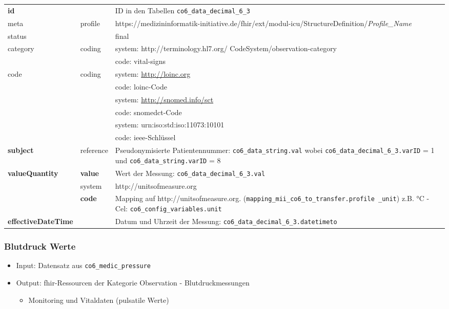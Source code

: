 \begin{longtable}{|l|l|p{7.5cm}|} 
	\hline
	\rowcolor{lightgray} \multicolumn{3}{|l|}{Data Mapping (inhaltlich) - nummerische Werte} \\ \hline
	\textbf{id} &  & ID in den Tabellen \texttt{co6\_data\_decimal\_6\_3} \\ \hline
	meta & profile & https://medizininformatik-initiative.de/fhir/ext/modul-icu/StructureDefinition/\textsl{Profile\_Name} \\ \hline 
	status &  & final  \\ \hline 
	category & coding & system: http://terminology.hl7.org/ CodeSystem/observation-category \\ 
	\cline{3-3}
	& & code: vital-signs \\ \hline
	code & coding & system: \url{http://loinc.org} \\ 
	\cline{3-3} 
	&  & code: \ac{loinc}-Code \\ 
	\cline{3-3} 
	&  & system: \url{http://snomed.info/sct} \\ 
	\cline{3-3}
	&  & code: \ac{snomedct}-Code \\ 
	\cline{3-3} 
	&  & system: urn:iso:std:iso:11073:10101 \\ 
	\cline{3-3}
	&  & code: \ac{ieee}-Schlüssel \\ \hline
	\textbf{subject} & reference & Pseudonymisierte Patientennummer: \texttt{co6\_data\_string.val} wobei \texttt{co6\_data\_decimal\_6\_3.varID} = 1 und \texttt{co6\_data\_string.varID} = 8 \\ \hline
	\textbf{valueQuantity} & \textbf{value} & Wert der Messung: \texttt{co6\_data\_decimal\_6\_3.val} \\
	\cline{2-3}
	 & system & http://unitsofmeasure.org \\ 
	 \cline{2-3}
	 & \textbf{code} & Mapping auf http://unitsofmeasure.org. (\texttt{mapping\_mii\_co6\_to\_transfer.profile \_unit}) z.B. °C - Cel: \texttt{co6\_config\_variables.unit} \\ \hline
    \textbf{effectiveDateTime} & & Datum und Uhrzeit der Messung: \texttt{co6\_data\_decimal\_6\_3.datetimeto} \\ \hline
\end{longtable}

\subsubsection{Blutdruck Werte} \label{subsub:bloodpressure}

\begin{itemize}
\item Input: Datensatz aus \texttt{co6\_medic\_pressure} 
\item Output: \ac{fhir}-Ressourcen der Kategorie \glqq Observation\grqq{} - Blutdruckmessungen
\begin{itemize}
	\item Monitoring und Vitaldaten (pulsatile Werte)
\end{itemize}
\end{itemize}

